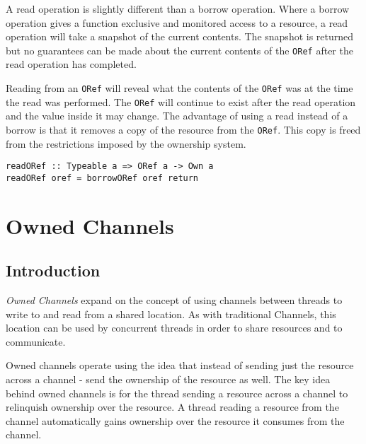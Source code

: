 \documentclass[onehalf,11pt]{beavtex}
\begin{document}
A read operation is slightly different than a borrow operation. Where a borrow
operation gives a function exclusive and monitored access to a resource, a read
operation will take a snapshot of the current contents. The snapshot is returned
but no guarantees can be made about the current contents of the \texttt{ORef}
after the read operation has completed.

Reading from an \texttt{ORef} will reveal what the contents of the \texttt{ORef}
was at the time the read was performed.  The \texttt{ORef} will continue to
exist after the read operation and the value inside it may change.
The advantage of using a read instead of a borrow is that it removes a copy of
the resource from the \texttt{ORef}. This copy is freed from the restrictions
imposed by the ownership system.

\begin{verbatim}
readORef :: Typeable a => ORef a -> Own a
readORef oref = borrowORef oref return
\end{verbatim}





\chapter{Owned Channels}

\section{Introduction}

\textit{Owned Channels} expand on the concept of using channels between threads
to write to and read from a shared location.   As with traditional Channels,
this location can be used by concurrent threads in order to share resources and
to communicate.


Owned channels operate using the idea that instead of sending just the
resource across a channel - send the ownership of the resource as well.
The key idea behind owned channels is for the thread sending a
resource across a channel to relinquish ownership over the resource.
A thread reading a resource from the channel automatically gains ownership over
the resource it consumes from the channel.
\end{document}
